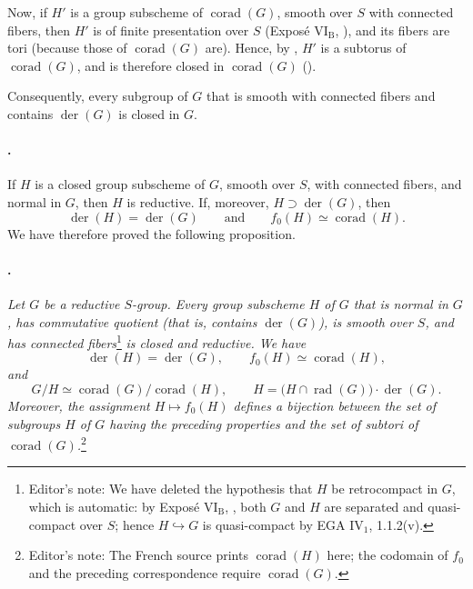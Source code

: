 Now, if \(H'\) is a group subscheme of
\(\operatorname{corad}(G)\), smooth over \(S\) with connected
fibers, then \(H'\) is of finite presentation over \(S\)
\textup{(Exposé \(\mathrm{VI_B}\), )}, and its fibers are tori
\textup{(because those of \(\operatorname{corad}(G)\) are)}.
Hence, by , \(H'\) is a subtorus of
\(\operatorname{corad}(G)\), and is therefore closed in
\(\operatorname{corad}(G)\) \textup{()}.

Consequently, every subgroup of \(G\) that is smooth with
connected fibers and contains \(\operatorname{der}(G)\) is closed
in \(G\).

\paragraph{.}
If \(H\) is a closed group subscheme of \(G\), smooth over \(S\),
with connected fibers, and normal in \(G\), then \(H\) is
reductive. If, moreover, \(H\supset\operatorname{der}(G)\), then
\[
  \operatorname{der}(H)=\operatorname{der}(G)
  \qquad\text{and}\qquad
  f_0(H)\simeq\operatorname{corad}(H).
\]
We have therefore proved the following proposition.

\paragraph{.}
\textit{Let \(G\) be a reductive \(S\)-group. Every group
subscheme \(H\) of \(G\) that is normal in \(G\), has commutative
quotient \textup{(that is, contains
\(\operatorname{der}(G)\))}, is smooth over \(S\), and has
connected fibers}\footnote{Editor's note: We have deleted the
hypothesis that \(H\) be retrocompact in \(G\), which is automatic:
by Exposé \(\mathrm{VI_B}\), , both \(G\) and \(H\) are
separated and quasi-compact over \(S\); hence
\(H\hookrightarrow G\) is quasi-compact by EGA
\(\mathrm{IV}_1\), 1.1.2\textup{(v)}.}
\textit{is closed and reductive. We have}
\[
  \operatorname{der}(H)=\operatorname{der}(G),
  \qquad
  f_0(H)\simeq\operatorname{corad}(H),
\]
\textit{and}
\[
  G/H\simeq
  \operatorname{corad}(G)/\operatorname{corad}(H),
  \qquad
  H=
  \bigl(H\cap\operatorname{rad}(G)\bigr)
  \cdot\operatorname{der}(G).
\]
\textit{Moreover, the assignment \(H\mapsto f_0(H)\) defines a
bijection between the set of subgroups \(H\) of \(G\) having the
preceding properties and the set of subtori of
\(\operatorname{corad}(G)\).}\footnote{Editor's note: The French
source prints \(\operatorname{corad}(H)\) here; the codomain of
\(f_0\) and the preceding correspondence require
\(\operatorname{corad}(G)\).}

